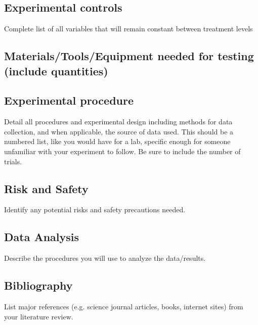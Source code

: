 \subsection{Experimental controls}
Complete list of all variables that will remain constant between treatment levels

\begin{field}

\end{field}

\subsection{Materials/Tools/Equipment needed for testing (include quantities)}

\begin{field}
   
\end{field}

\subsection{Experimental procedure} 

Detail all procedures and experimental design including methods for data collection, and when applicable, the source of data used. This should be a numbered list, like you would have for a lab, specific enough for someone unfamiliar with your experiment to follow. Be sure to include the number of trials.

\begin{field}
  
\end{field}


\subsection{Risk and Safety}

Identify any potential risks and safety precautions needed.

\begin{field}

\end{field}

\subsection{Data Analysis}

Describe the procedures you will use to analyze the data/results. 

\begin{field}
   
\end{field}

\subsection{Bibliography}

List major references (e.g. science journal articles, books, internet sites) from your literature review.

\begin{field}
    \printbibliography[heading=none]
\end{field}
